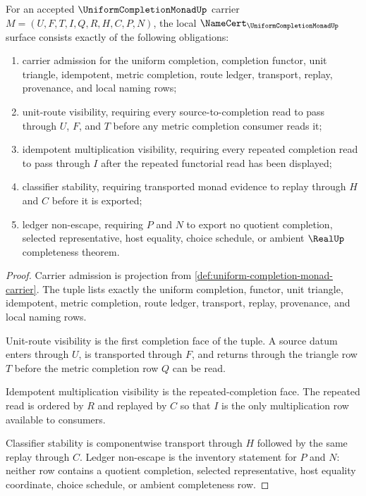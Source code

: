 \begin{theorem}\label{thm:uniform-completion-monad-namecert-obligations}
For an accepted $\UniformCompletionMonadUp$ carrier $M=(U,F,T,I,Q,R,H,C,P,N)$, the local $\NameCert_{\UniformCompletionMonadUp}$ surface consists exactly of the following obligations:
\begin{enumerate}
\item carrier admission for the uniform completion, completion functor, unit triangle, idempotent, metric completion, route ledger, transport, replay, provenance, and local naming rows;
\item unit-route visibility, requiring every source-to-completion read to pass through $U$, $F$, and $T$ before any metric completion consumer reads it;
\item idempotent multiplication visibility, requiring every repeated completion read to pass through $I$ after the repeated functorial read has been displayed;
\item classifier stability, requiring transported monad evidence to replay through $H$ and $C$ before it is exported;
\item ledger non-escape, requiring $P$ and $N$ to export no quotient completion, selected representative, host equality, choice schedule, or ambient $\RealUp$ completeness theorem.
\end{enumerate}
\end{theorem}
\begin{proof}
Carrier admission is projection from \autoref{def:uniform-completion-monad-carrier}. The tuple lists exactly the uniform completion, functor, unit triangle, idempotent, metric completion, route ledger, transport, replay, provenance, and local naming rows.

Unit-route visibility is the first completion face of the tuple. A source datum enters through $U$, is transported through $F$, and returns through the triangle row $T$ before the metric completion row $Q$ can be read.

Idempotent multiplication visibility is the repeated-completion face. The repeated read is ordered by $R$ and replayed by $C$ so that $I$ is the only multiplication row available to consumers.

Classifier stability is componentwise transport through $H$ followed by the same replay through $C$. Ledger non-escape is the inventory statement for $P$ and $N$: neither row contains a quotient completion, selected representative, host equality coordinate, choice schedule, or ambient completeness row.
\end{proof}

